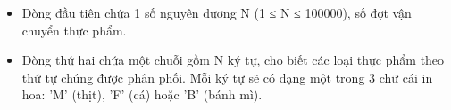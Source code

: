 \begin{itemize}
	\item     Dòng đầu tiên chứa 1 số nguyên dương N (1 ≤ N ≤ 100000), số đợt vận chuyển thực phẩm.   
	\item     Dòng thứ hai chứa một chuỗi gồm N ký tự, cho biết các loại thực phẩm theo thứ tự chúng được phân phối. Mỗi ký tự sẽ có dạng một trong 3 chữ cái in hoa: 'M' (thịt), 'F' (cá) hoặc 'B' (bánh mì).   
\end{itemize}

\